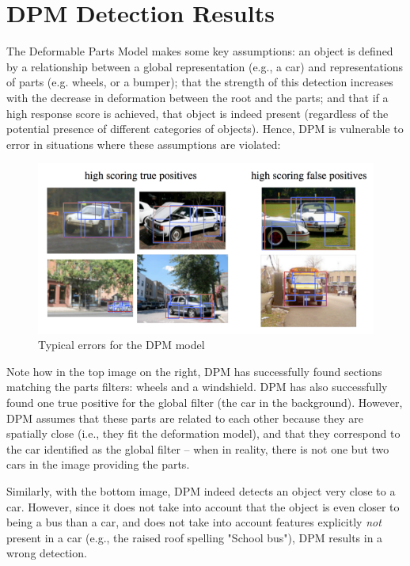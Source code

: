 \documentclass{article}
\begin{document}
\section{DPM Detection Results}

The Deformable Parts Model makes some key assumptions: an object is defined by a relationship between a global representation (e.g., a car) and representations of parts (e.g. wheels, or a bumper); that the strength of this detection increases with the decrease in deformation between the root and the parts; and that if a high response score is achieved, that object is indeed present (regardless of the potential presence of different categories of objects). Hence, DPM is vulnerable to error in situations where these assumptions are violated:

\begin{figure}[h!]
	\center
	\includegraphics[scale=0.6]{results-tpfp.png}
    \caption{Typical errors for the DPM model}
    \label{fig:results-tpfp}
\end{figure}



Note how in the top image on the right, DPM has successfully found sections matching the parts filters: wheels and a windshield. DPM has also successfully found one true positive for the global filter (the car in the background). However, DPM assumes that these parts are related to each other because they are spatially close (i.e., they fit the deformation model), and that they correspond to the car identified as the global filter -- when in reality, there is not one but two cars in the image providing the parts.

Similarly, with the bottom image, DPM indeed detects an object very close to a car. However, since it does not take into account that the object is even closer to being a bus than a car, and does not take into account features explicitly \textit{not} present in a car (e.g., the raised roof spelling "School bus"), DPM results in a wrong detection.
\end{document}
